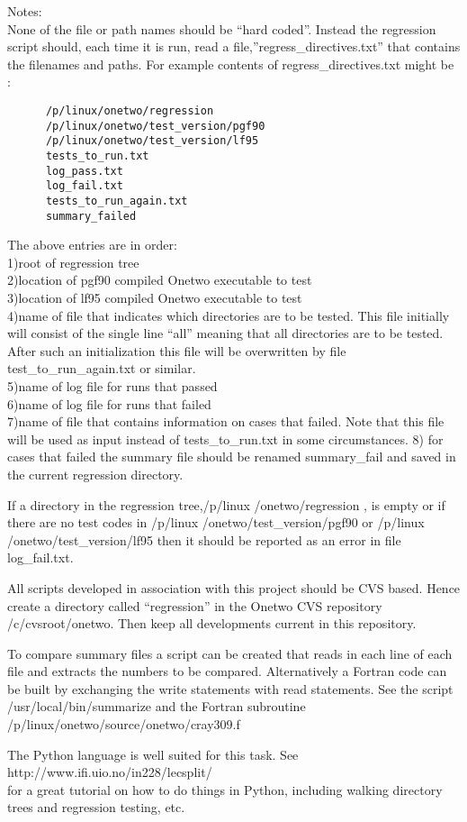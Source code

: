 \documentclass[12pt]{article}
\begin{document}
 \noindent Notes:  \\

  None of the file or path names should be ``hard coded''. Instead the
 regression script should, each time it is run, read a
 file,''regress\_directives.txt'' that contains the filenames and
 paths. For example contents of regress\_directives.txt might be : \\
  \begin{verbatim}
      /p/linux/onetwo/regression         
      /p/linux/onetwo/test_version/pgf90                           
      /p/linux/onetwo/test_version/lf95  
      tests_to_run.txt 
      log_pass.txt 
      log_fail.txt 
      tests_to_run_again.txt 
      summary_failed  
\end{verbatim} 

  The above entries are in order: \\
  1)root of regression tree       \\
  2)location of  pgf90 compiled  Onetwo executable  to test  \\
  3)location of  lf95  compiled  Onetwo executable  to test  \\
  4)name of file that indicates which directories are to be 
    tested. This file initially will consist of the single line
    ``all'' meaning that all directories are to be tested.
    After such an initialization this file will be overwritten by
    file test\_to\_run\_again.txt or similar. \\
  5)name of log file for runs that passed  \\
  6)name of log file for runs that failed  \\
  7)name of file that contains information on cases that failed.
    Note that this file will be used as input instead of
    tests\_to\_run.txt in some circumstances.
  8) for cases that failed the summary file should be renamed
    summary\_fail and saved in the current regression directory.


   If a directory in the regression tree,/p/linux /onetwo/regression ,
   is empty or if there are no test codes in
   /p/linux /onetwo/test\_version/pgf90   or       
   /p/linux /onetwo/test\_version/lf95   then it should be
   reported as an error in file log\_fail.txt.

  All scripts developed in association with this project should be 
  CVS based. Hence create a directory called ``regression'' in the Onetwo
  CVS repository /c/cvsroot/onetwo. Then keep all developments current
  in this repository.

 To compare summary files a script can be created that reads in each
 line of each file and extracts the numbers to be compared.
 Alternatively a Fortran code can be built by exchanging the 
 write statements with read statements. See the script
 /usr/local/bin/summarize and the Fortran subroutine 
  /p/linux/onetwo/source/onetwo/cray309.f 

 The Python language is well suited for this task. See \\
 http://www.ifi.uio.no/in228/lecsplit/ \\
 for a great tutorial on how to do things in Python,
 including walking directory trees and regression testing, etc.


  
\end{document}
